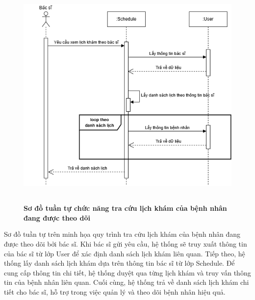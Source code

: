 \begin{figure}[H]
	\centering
	\includegraphics[width=12cm,height=11.5cm]{Images/sequence/schedule/getByDoctor.drawio.png}
	\caption[Sơ đồ tuần tự chức năng tra cứu lịch khám của bệnh nhân đang được theo dõi]{\bfseries \fontsize{12pt}{0pt}
		\selectfont Sơ đồ tuần tự chức năng tra cứu lịch khám của bệnh nhân đang được theo dõi}
	\label{sequence_get_by_doctor} %
\end{figure}
Sơ đồ tuần tự trên minh họa quy trình tra cứu lịch khám của bệnh nhân đang được theo dõi bởi bác sĩ. Khi bác sĩ gửi yêu cầu, hệ thống sẽ truy xuất thông tin của bác sĩ từ lớp User để xác định danh sách lịch khám liên quan.
Tiếp theo, hệ thống lấy danh sách lịch khám dựa trên thông tin bác sĩ từ lớp Schedule. Để cung cấp thông tin chi tiết, hệ thống duyệt qua từng lịch khám và truy vấn thông tin của bệnh nhân liên quan.
Cuối cùng, hệ thống trả về danh sách lịch khám chi tiết cho bác sĩ, hỗ trợ trong việc quản lý và theo dõi bệnh nhân hiệu quả.

